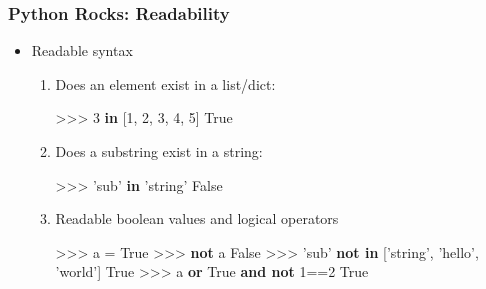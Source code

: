 \documentclass[t,10pt,compress=false,usepdftitle=false]{beamer}
\begin{document}
\begin{frame}[fragile]
    \frametitle{Python Rocks: Readability}
    \begin{itemize}
        \item Readable syntax
        \pause
        \begin{enumerate}
            \item Does an element exist in a list/dict:
            	\begin{myColorBox}{0.8}{}
\begin{semiverbatim}
>>> 3 \textbf{in} [1, 2, 3, 4, 5]
True
\end{semiverbatim}
            	\end{myColorBox}
            \pause
            \item Does a substring exist in a string:
            	\begin{myColorBox}{0.8}{}
\begin{semiverbatim}
>>> 'sub' \textbf{in} 'string'
False
\end{semiverbatim}
	    	\end{myColorBox}
            \pause
            \item Readable boolean values and logical operators
            	\begin{myColorBox}{0.8}{}
\begin{semiverbatim}
>>> a = True
>>> \textbf{not} a
False
>>> 'sub' \textbf{not in} ['string', 'hello', 'world']
True
>>> a \textbf{or} True \textbf{and not} 1==2
True
\end{semiverbatim}
	    	\end{myColorBox}
        \end{enumerate}
    \end{itemize}
\end{frame}
\end{document}
